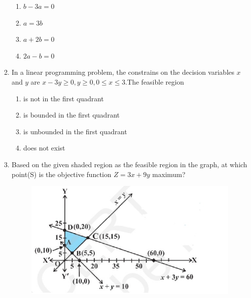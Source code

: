 \documentclass{article}
\begin{document}
\begin{enumerate}
\begin{enumerate}
    \item $b-3a=0$
    \item $a=3b$
    \item $a+2b=0$
    \item $2a-b=0$
\end{enumerate}
\item In a linear programming problem, the constrains on the decision variables $x$ and $y$ are $x-3y \geq 0, y \geq 0, 0\leq x \leq 3$.The feasible region 
\begin{enumerate}
    \item is not in the first quadrant
    \item is bounded in the first quadrant 
    \item is unbounded in the first quadrant 
    \item does not exist  
\end{enumerate}
\item Based on the given shaded region as the feasible region in the graph, at which point(S) is the objective function $Z=3x+9y$ maximum?
\begin{figure}[h]
    \centering{}
    \includegraphics[width=\columnwidth]{figs/fig1.jpg}
    

\end{figure}
\end{enumerate}
\end{document}
